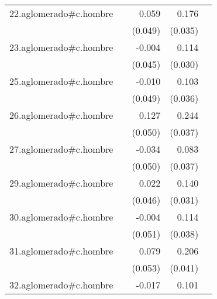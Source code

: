 {\begin{longtable}{l*{4}{D{.}{.}{-1}}}
\addlinespace
22.aglomerado#c.hombre&                     &       0.059         &       0.176\sym{***}&                     \\
            &                     &     (0.049)         &     (0.035)         &                     \\
\addlinespace
23.aglomerado#c.hombre&                     &      -0.004         &       0.114\sym{***}&                     \\
            &                     &     (0.045)         &     (0.030)         &                     \\
\addlinespace
25.aglomerado#c.hombre&                     &      -0.010         &       0.103\sym{**} &                     \\
            &                     &     (0.049)         &     (0.036)         &                     \\
\addlinespace
26.aglomerado#c.hombre&                     &       0.127\sym{*}  &       0.244\sym{***}&                     \\
            &                     &     (0.050)         &     (0.037)         &                     \\
\addlinespace
27.aglomerado#c.hombre&                     &      -0.034         &       0.083\sym{*}  &                     \\
            &                     &     (0.050)         &     (0.037)         &                     \\
\addlinespace
29.aglomerado#c.hombre&                     &       0.022         &       0.140\sym{***}&                     \\
            &                     &     (0.046)         &     (0.031)         &                     \\
\addlinespace
30.aglomerado#c.hombre&                     &      -0.004         &       0.114\sym{**} &                     \\
            &                     &     (0.051)         &     (0.038)         &                     \\
\addlinespace
31.aglomerado#c.hombre&                     &       0.079         &       0.206\sym{***}&                     \\
            &                     &     (0.053)         &     (0.041)         &                     \\
\addlinespace
32.aglomerado#c.hombre&                     &      -0.017         &       0.101\sym{***}&                     \\

\end{longtable}}
